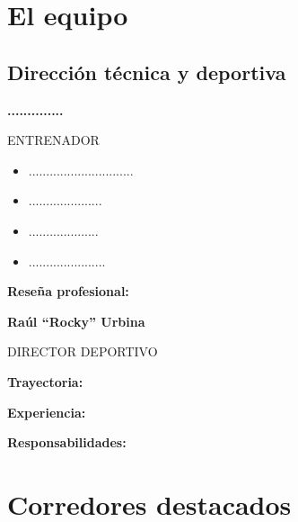 \section{El equipo}
\subsection{Dirección técnica y deportiva}

\begin{minipage}[t]{0.47\textwidth}
  \vspace{4mm}

  {\Large\bfseries ..............}\par
  \textcolor{rockyred}{ENTRENADOR}\par

  \begin{itemize}[leftmargin=5mm,label=\textcolor{rockyred}{\textbullet}]
    \item ..............................
    \item .....................
    \item ....................
    \item ......................
  \end{itemize}
  \textbf{Reseña profesional:} \dato
\end{minipage}\hfill
\begin{minipage}[t]{0.47\textwidth}
  \vspace{4mm}

  {\Large\bfseries Raúl ``Rocky'' Urbina}\par
  \textcolor{rockyred}{DIRECTOR DEPORTIVO}\par

  \textbf{Trayectoria:} \dato

  \textbf{Experiencia:} \dato

  \textbf{Responsabilidades:} \dato
\end{minipage}

\newpage
\section*{Corredores destacados}

